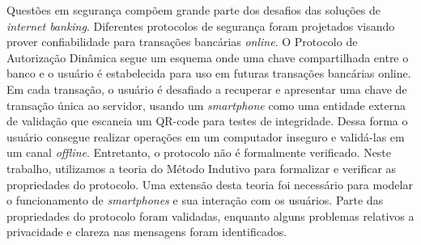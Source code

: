 Questões em segurança compõem grande parte dos desafios das soluções de \textit{internet banking}. Diferentes protocolos de segurança foram projetados visando prover confiabilidade para transações bancárias \textit{online}. O Protocolo de Autorização Dinâmica segue um esquema onde uma chave compartilhada entre o banco e o usuário é estabelecida para uso em futuras transações bancárias online. Em cada transação, o usuário é desafiado a recuperar e apresentar uma chave de transação única ao servidor, usando um \textit{smartphone} como uma entidade externa de validação que escaneia um QR-code para testes de integridade. Dessa forma o usuário consegue realizar operações em um computador inseguro e validá-las em um canal \textit{offline}. Entretanto, o protocolo não é formalmente verificado. Neste trabalho, utilizamos a teoria do Método Indutivo para formalizar e verificar as propriedades do protocolo. Uma extensão desta teoria foi necessário para modelar o funcionamento de \textit{smartphones} e sua interação com os usuários. Parte das propriedades do protocolo foram validadas, enquanto alguns problemas relativos a privacidade e clareza nas mensagens foram identificados.